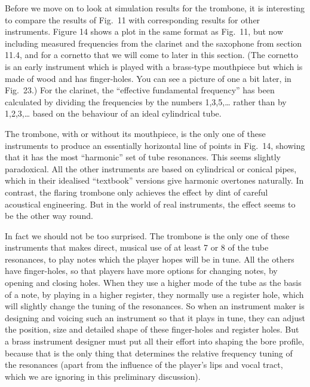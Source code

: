   Before we move on to look at simulation results for the trombone, it is 
  interesting to compare the results of Fig.\ 11 with corresponding results for 
  other instruments. Figure 14 shows a plot in the same format as Fig.\ 11, but 
  now including measured frequencies from the clarinet and the saxophone from 
  section 11.4, and for a cornetto that we will come to later in this section. 
  (The cornetto is an early instrument which is played with a brass-type 
  mouthpiece but which is made of wood and has finger-holes. You can see a 
  picture of one a bit later, in Fig.\ 23.) For the clarinet, the “effective 
  fundamental frequency” has been calculated by dividing the frequencies by the 
  numbers 1,3,5,… rather than by 1,2,3,… based on the behaviour of an ideal 
  cylindrical tube. 

  The trombone, with or without its mouthpiece, is the only one of these 
  instruments to produce an essentially horizontal line of points in Fig.\ 14, 
  showing that it has the most “harmonic” set of tube resonances. This seems 
  slightly paradoxical. All the other instruments are based on cylindrical or 
  conical pipes, which in their idealised “textbook” versions give harmonic 
  overtones naturally. In contrast, the flaring trombone only achieves the 
  effect by dint of careful acoustical engineering. But in the world of real 
  instruments, the effect seems to be the other way round. 

  In fact we should not be too surprised. The trombone is the only one of these 
  instruments that makes direct, musical use of at least 7 or 8 of the tube 
  resonances, to play notes which the player hopes will be in tune. All the 
  others have finger-holes, so that players have more options for changing 
  notes, by opening and closing holes. When they use a higher mode of the tube 
  as the basis of a note, by playing in a higher register, they normally use a 
  register hole, which will slightly change the tuning of the resonances. So 
  when an instrument maker is designing and voicing such an instrument so that 
  it plays in tune, they can adjust the position, size and detailed shape of 
  these finger-holes and register holes. But a brass instrument designer must 
  put all their effort into shaping the bore profile, because that is the only 
  thing that determines the relative frequency tuning of the resonances (apart 
  from the influence of the player's lips and vocal tract, which we are 
  ignoring in this preliminary discussion). 


